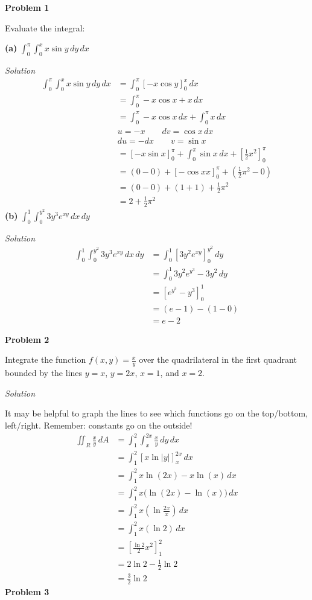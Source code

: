 \documentclass{article}
\newcommand{\lrp}[1]{\left( #1 \right)}
\newcommand{\lrb}[1]{\left[ #1 \right]}
\newcommand{\Solution}{\textit{Solution}}
\begin{document}
\textbf{Problem 1}

Evaluate the integral:

\textbf{(a)} $\displaystyle \int_0^\pi \int_0^x x\sin y\,dy\,dx$

\Solution
\begin{align*}
    \int_0^\pi \int_0^x x\sin y\,dy\,dx&=\int_0^\pi \lrb{-x\cos y}_0^x\,dx\\
    &=\int_0^\pi -x\cos x + x\,dx\\
    &=\int_0^\pi -x\cos x \,dx+\int_0^\pi x \,dx\\
    &u=-x\hspace{2em}dv=\cos x\,dx\\
    &du=-dx\hspace{2em}v=\sin x\\
    &=\lrb{-x\sin x}_0^\pi +\int_0^\pi \sin x\,dx + \lrb{\frac{1}{2}x^2}_0^\pi\\
    &=\lrp{0-0}+\lrb{-\cos x x}_0^\pi + \lrp{\frac{1}{2}\pi^2-0}\\
    &=(0-0)+(1+1)+\frac{1}{2}\pi^2\\
    &=\boxed{2+\frac{1}{2}\pi^2}
\end{align*}
\textbf{(b)} $\displaystyle \int_0^1\int_0^{y^2}3y^3e^{xy}\,dx\,dy$

\Solution
\begin{align*}
    \int_0^1\int_0^{y^2}3y^3e^{xy}\,dx\,dy&=\int_0^1\lrb{3y^2e^{xy}}_0^{y^2}\,dy\\
    &=\int_0^1 3y^2e^{y^3}-3y^2\,dy\\
    &=\lrb{e^{y^3}-y^3}_0^1\tag{you could also u-sub...}\\
    &=\lrp{e-1}-\lrp{1-0}\\
    &=\boxed{e-2}
\end{align*}

\textbf{Problem 2}

Integrate the function $\displaystyle f(x,y)=\frac{x}{y}$ over the quadrilateral in the first quadrant bounded by the lines $y=x$, $y=2x$, $x=1$, and $x=2$.

\Solution

It may be helpful to graph the lines to see which functions go on the top/bottom, left/right.
Remember: constants go on the outside!
\begin{align*}
    \iint_R \frac{x}{y}\,dA&=\int_1^2\int_x^{2x} \frac{x}{y}\,dy\,dx\\
    &=\int_1^2\lrb{x\ln\left|y\right|}_x^{2x}\,dx\\
    &=\int_1^2 x\ln (2x) - x\ln (x) \,dx\tag{ok to drop abs since always positive}\\
    &=\int_1^2 x\big(\ln (2x)-\ln (x)\big)\,dx\\
    &=\int_1^2 x\lrp{\ln \frac{2x}{x}}\,dx\tag{properties of log}\\
    &=\int_1^2 x(\ln 2)\,dx\\
    &=\lrb{\frac{\ln 2}{2}x^2}_1^2\\
    &=2\ln 2 - \frac{1}{2}\ln 2\\
    &=\boxed{\frac{3}{2}\ln 2}
\end{align*}
\textbf{Problem 3}
\end{document}
